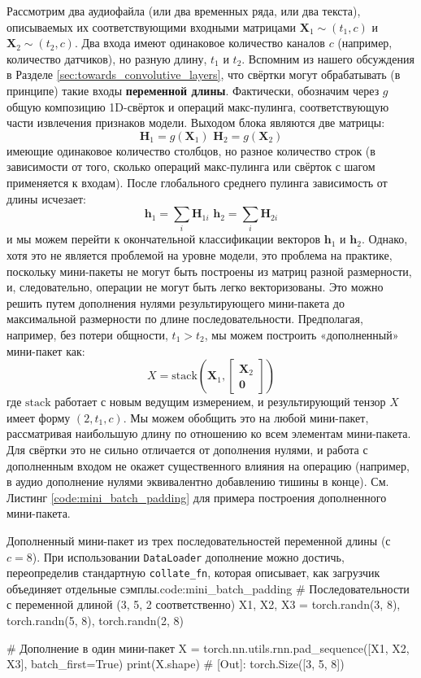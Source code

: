 Рассмотрим два аудиофайла (или два временных ряда, или два текста), описываемых их соответствующими входными матрицами $\mathbf{X}_1 \sim (t_1, c)$ и $\mathbf{X}_2 \sim (t_2, c)$. Два входа имеют одинаковое количество каналов $c$ (например, количество датчиков), но разную длину, $t_1$ и $t_2$. Вспомним из нашего обсуждения в Разделе \ref{sec:towards_convolutive_layers}, что свёртки могут обрабатывать (в принципе) такие входы \textbf{переменной длины}. Фактически, обозначим через $g$ общую композицию 1D-свёрток и операций макс-пулинга, соответствующую части извлечения признаков модели. Выходом блока являются две матрицы:
%
$$
\mathbf{H}_1=g(\mathbf{X}_1)\,\,\mathbf{H}_2=g(\mathbf{X}_2)
$$
%
имеющие одинаковое количество столбцов, но разное количество строк (в зависимости от того, сколько операций макс-пулинга или свёрток с шагом применяется к входам). После глобального среднего пулинга зависимость от длины исчезает:
%
$$
\mathbf{h}_1=\sum_i\mathbf{H}_{1i} \,\,\mathbf{h}_2=\sum_i\mathbf{H}_{2i}
$$
%
и мы можем перейти к окончательной классификации векторов $\mathbf{h}_1$ и $\mathbf{h}_2$. Однако, хотя это не является проблемой на уровне модели, это проблема на практике, поскольку мини-пакеты не могут быть построены из матриц разной размерности, и, следовательно, операции не могут быть легко векторизованы. Это можно решить путем дополнения нулями результирующего мини-пакета до максимальной размерности по длине последовательности. Предполагая, например, без потери общности, $t_1 > t_2$, мы можем построить «дополненный» мини-пакет как:
%
$$
X=\text{stack}\left(\mathbf{X}_1,\begin{bmatrix}\mathbf{X}_2\\ \mathbf{0}\end{bmatrix}\right)
$$
%
где $\text{stack}$ работает с новым ведущим измерением, и результирующий тензор $X$ имеет форму $(2, t_1,  c)$. Мы можем обобщить это на любой мини-пакет, рассматривая наибольшую длину по отношению ко всем элементам мини-пакета. Для свёртки это не сильно отличается от дополнения нулями, и работа с дополненным входом не окажет существенного влияния на операцию (например, в аудио дополнение нулями эквивалентно добавлению тишины в конце).  См. Листинг \ref{code:mini_batch_padding} для примера построения дополненного мини-пакета. 

\begin{mypy}{Дополненный мини-пакет из трех последовательностей переменной длины (с $c=8$). При использовании {\footnotesize\texttt{DataLoader}} дополнение можно достичь, переопределив стандартную {\footnotesize\texttt{collate_fn}}, которая описывает, как загрузчик объединяет отдельные сэмплы.}{code:mini_batch_padding}
# Последовательности с переменной длиной (3, 5, 2 соответственно)
X1, X2, X3 = torch.randn(3, 8), 
             torch.randn(5, 8), 
             torch.randn(2, 8)

# Дополнение в один мини-пакет
X = torch.nn.utils.rnn.pad_sequence([X1, X2, X3], 
                    batch_first=True)
print(X.shape) # [Out]: torch.Size([3, 5, 8])
\end{mypy}

